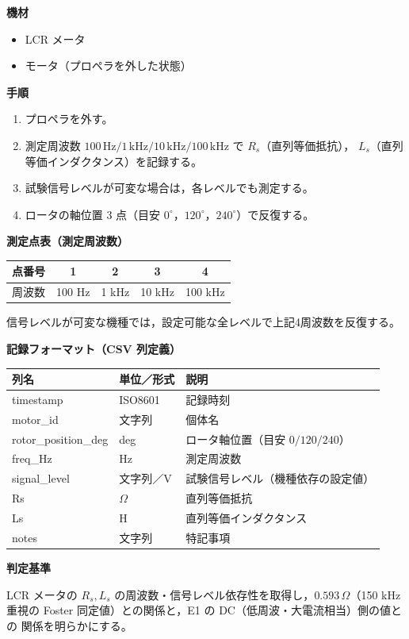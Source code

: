 \documentclass[a4paper,11pt]{ltjsarticle}
\newcommand{\expfield}[1]{\medskip\noindent\textbf{#1}\par\nobreak\smallskip\noindent}
\newcommand{\ohm}{\ensuremath{\Omega}}
\begin{document}
\expfield{機材}
\begin{itemize}
  \item LCR メータ
  \item モータ（プロペラを外した状態）
\end{itemize}

\expfield{手順}
\begin{enumerate}
  \item プロペラを外す。
  \item 測定周波数 $100\,\mathrm{Hz} / 1\,\mathrm{kHz} / 10\,\mathrm{kHz} / 100\,\mathrm{kHz}$ で $R_s$（直列等価抵抗），
    $L_s$（直列等価インダクタンス）を記録する。
  \item 試験信号レベルが可変な場合は，各レベルでも測定する。
  \item ロータの軸位置 3 点（目安 $0^\circ$，$120^\circ$，$240^\circ$）で反復する。
\end{enumerate}

\expfield{測定点表（測定周波数）}
\begin{center}
\footnotesize
\begin{tabular}{@{}l*{4}{c}@{}}
\toprule
点番号 & 1 & 2 & 3 & 4 \\
\midrule
周波数 & 100 Hz & 1 kHz & 10 kHz & 100 kHz \\
\bottomrule
\end{tabular}
\end{center}
{\footnotesize 信号レベルが可変な機種では，設定可能な全レベルで上記4周波数を反復する。}

\expfield{記録フォーマット（CSV 列定義）}
\begin{tabular}{@{}p{34mm}p{26mm}p{93mm}@{}}
\toprule
列名 & 単位／形式 & 説明 \\
\midrule
timestamp & ISO8601 & 記録時刻 \\
motor\_id & 文字列 & 個体名 \\
rotor\_position\_deg & deg & ロータ軸位置（目安 $0/120/240$） \\
freq\_Hz & Hz & 測定周波数 \\
signal\_level & 文字列／V & 試験信号レベル（機種依存の設定値） \\
Rs & \ohm & 直列等価抵抗 \\
Ls & H & 直列等価インダクタンス \\
notes & 文字列 & 特記事項 \\
\bottomrule
\end{tabular}

\expfield{判定基準}
LCR メータの $R_s, L_s$ の周波数・信号レベル依存性を取得し，$0.593\,\Omega$（150 kHz 重視の Foster 同定値）との関係と，E1 の DC（低周波・大電流相当）側の値との
関係を明らかにする。
\end{document}
